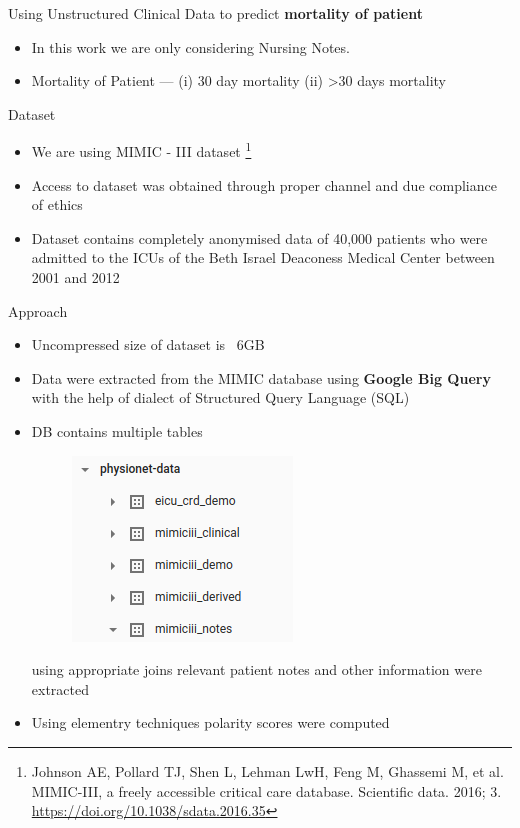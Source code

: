 \documentclass[11pt]{beamer}
\begin{document}
\begin{frame}{}
	\begin{block}{Using Unstructured Clinical Data to predict \textbf{mortality of patient}}
		\begin{itemize}
			\item In this work we are only considering Nursing Notes. 
			\item Mortality of Patient --- (i) 30 day mortality (ii) >30 days mortality
		\end{itemize}
	\end{block}
	
	\begin{block}{Dataset}
		\begin{itemize}
			\item We are using MIMIC - III dataset \footnote{Johnson AE, Pollard TJ, Shen L, Lehman LwH, Feng M, Ghassemi M, et al. MIMIC-III, a freely accessible critical care database. Scientific data. 2016; 3. \url{https://doi.org/10.1038/sdata.2016.35}}
			\item Access to dataset was obtained through proper channel and due compliance of ethics 
			\item Dataset contains completely anonymised data of 40,000 patients who were admitted to the
			ICUs of the Beth Israel Deaconess Medical Center between 2001 and 2012
		\end{itemize}
	\end{block}
	
	

 \end{frame}

\begin{frame}{Approach}
\begin{itemize}
	\item Uncompressed size of dataset is ~6GB
\item Data were extracted from the MIMIC database using
\textbf{Google Big Query} with the help of dialect of Structured Query Language (SQL)
\item DB contains multiple tables %
\begin{figure}
	\centering
	\includegraphics[width=0.2\linewidth]{db}
	\label{fig:db}
\end{figure}
using appropriate joins relevant patient notes and other information were extracted
\item Using elementry techniques polarity scores were computed
\end{itemize}

\end{frame}
\end{document}
